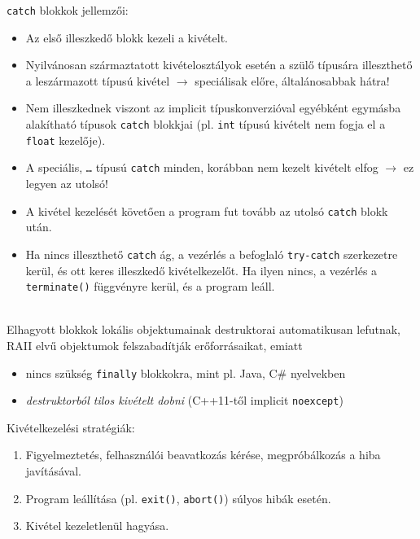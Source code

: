 \documentclass[usenames,dvipsnames,aspectratio=169]{beamer}
\begin{document}
\begin{frame}
    \texttt{catch} blokkok jellemzői:
    \begin{itemize}
        \item Az első illeszkedő blokk kezeli a kivételt.
        \item Nyilvánosan származtatott kivételosztályok esetén a szülő típusára illeszthető a leszármazott típusú kivétel $\to$ speciálisak előre, általánosabbak hátra!
        \item Nem illeszkednek viszont az implicit típuskonverzióval egyébként egymásba alakítható típusok \texttt{catch} blokkjai (pl. \texttt{int} típusú kivételt nem fogja el a \texttt{float} kezelője).
        \item A speciális, \texttt{\dots} típusú \texttt{catch} minden, korábban nem kezelt kivételt elfog $\to$ ez legyen az utolsó!
        \item A kivétel kezelését követően a program fut tovább az utolsó \texttt{catch} blokk után.
        \item Ha nincs illeszthető \texttt{catch} ág, a vezérlés a befoglaló \texttt{try-catch} szerkezetre kerül, és ott keres illeszkedő kivételkezelőt. Ha ilyen nincs, a vezérlés a \texttt{terminate()} függvényre kerül, és a program leáll.
    \end{itemize}
\end{frame}

\begin{frame}
    \begin{description}[m]
        \item[Veremlebontás (stack unwinding)] \hfill \\
            Elhagyott blokkok lokális objektumainak destruktorai automatikusan lefutnak, RAII elvű objektumok felszabadítják erőforrásaikat, emiatt
            \begin{itemize}
                \item nincs szükség \texttt{finally} blokkokra, mint pl. Java, C\# nyelvekben
                \item \emph{destruktorból tilos kivételt dobni} (C++11-től implicit \texttt{noexcept})
            \end{itemize}
    \end{description}
    \vfill
    Kivételkezelési stratégiák:
    \begin{enumerate}
        \item Figyelmeztetés, felhasználói beavatkozás kérése, megpróbálkozás a hiba javításával.
        \item Program leállítása (pl. \texttt{exit()}, \texttt{abort()}) súlyos hibák esetén.
        \item Kivétel kezeletlenül hagyása.
    \end{enumerate}
\end{frame}
\end{document}
